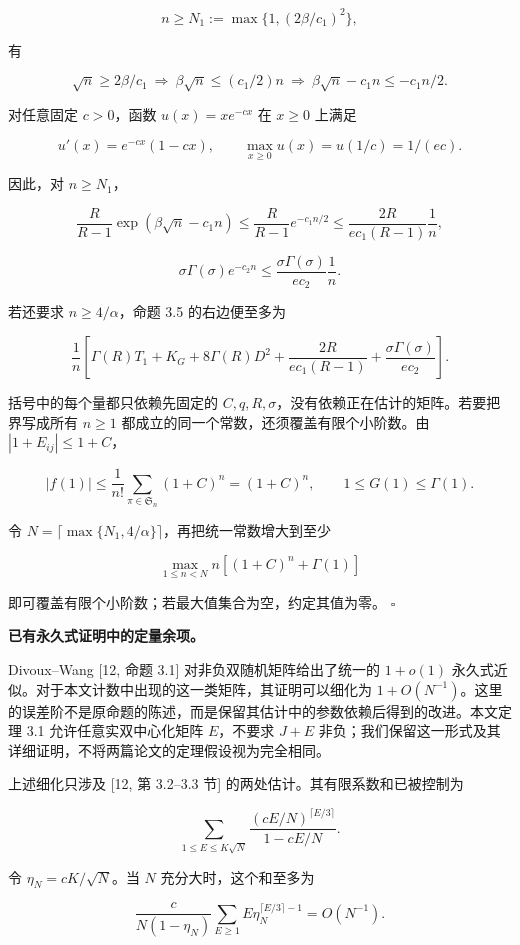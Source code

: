 \documentclass[11pt,a4paper]{article}
\begin{document}
\[
n\ge N_1:=\max\{1,(2\beta/c_1)^2\},
\]

有

\[
\sqrt n\ge2\beta/c_1
\ \Longrightarrow\ 
\beta\sqrt n\le(c_1/2)n
\ \Longrightarrow\ 
\beta\sqrt n-c_1n\le-c_1n/2.
\]

对任意固定 \(c>0\)，函数 \(u(x)=xe^{-cx}\) 在 \(x\ge0\) 上满足

\[
u'(x)=e^{-cx}(1-cx),\qquad
\max_{x\ge0}u(x)=u(1/c)=1/(ec).
\]

因此，对 \(n\ge N_1\)，

\[
\frac R{R-1}\exp(\beta\sqrt n-c_1n)
\le\frac R{R-1}e^{-c_1n/2}
\le\frac{2R}{ec_1(R-1)}\frac1n,
\]

\[
\sigma\Gamma(\sigma)e^{-c_2n}
\le\frac{\sigma\Gamma(\sigma)}{ec_2}\frac1n.
\]

若还要求 \(n\ge4/\alpha\)，命题 3.5 的右边便至多为

\[
\frac1n\left[
\Gamma(R)T_1+K_G+8\Gamma(R)D^2
+\frac{2R}{ec_1(R-1)}
+\frac{\sigma\Gamma(\sigma)}{ec_2}\right].
\]

括号中的每个量都只依赖先固定的 \(C,q,R,\sigma\)，没有依赖正在估计的矩阵。若要把界写成所有 \(n\ge1\) 都成立的同一个常数，还须覆盖有限个小阶数。由 \(|1+E_{ij}|\le1+C\)，

\[
|f(1)|\le\frac1{n!}\sum_{\pi\in \mathfrak S_n}(1+C)^n=(1+C)^n,
\qquad 1\le G(1)\le\Gamma(1).
\]

令 \(N=\lceil\max\{N_1,4/\alpha\}\rceil\)，再把统一常数增大到至少

\[
\max_{1\le n<N}n\left[(1+C)^n+\Gamma(1)\right]
\]

即可覆盖有限个小阶数；若最大值集合为空，约定其值为零。 \(\square\)

\textbf{已有永久式证明中的定量余项。}

Divoux--Wang {[}12, 命题 3.1{]} 对非负双随机矩阵给出了统一的 \(1+o(1)\) 永久式近似。对于本文计数中出现的这一类矩阵，其证明可以细化为 \(1+O(N^{-1})\)。这里的误差阶不是原命题的陈述，而是保留其估计中的参数依赖后得到的改进。本文定理 3.1 允许任意实双中心化矩阵 \(E\)，不要求 \(J+E\) 非负；我们保留这一形式及其详细证明，不将两篇论文的定理假设视为完全相同。

上述细化只涉及 {[}12, 第 3.2--3.3 节{]} 的两处估计。其有限系数和已被控制为

\[
\sum_{1\le E\le K\sqrt N}
\frac{(cE/N)^{\lceil E/3\rceil}}{1-cE/N}.
\]

令 \(\eta_N=cK/\sqrt N\)。当 \(N\) 充分大时，这个和至多为

\[
\frac{c}{N(1-\eta_N)}
\sum_{E\ge1}E\eta_N^{\lceil E/3\rceil-1}
=O(N^{-1}).
\]
\end{document}
